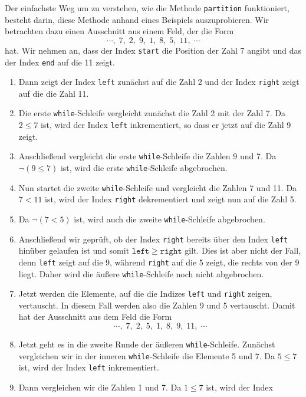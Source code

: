 Der einfachste Weg um zu verstehen, wie die Methode \texttt{partition} funktioniert,
besteht darin, diese Methode anhand eines Beispiels auszuprobieren.  Wir betrachten dazu 
einen Ausschnitt aus einem Feld, der die Form 
\[ \cdots,\; 7,\; 2,\; 9,\; 1,\; 8,\; 5,\; 11,\;\cdots \]
hat.  Wir nehmen an, dass der Index \texttt{start} die Position der Zahl 7 angibt und das
der Index \texttt{end} auf die 11 zeigt.  
\begin{enumerate}
\item Dann zeigt der Index \texttt{left} zun\"achst auf
      die Zahl 2 und der Index \texttt{right} zeigt auf die die Zahl 11.
\item Die erste \texttt{while}-Schleife vergleicht zun\"achst die Zahl 2 mit der Zahl 7.
      Da $2 \leq 7$ ist, wird der Index \texttt{left} inkrementiert, so dass er jetzt auf 
      die Zahl 9 zeigt.
\item Anschlie\ss{}end vergleicht die  erste \texttt{while}-Schleife die Zahlen 9 und 7.
      Da $\neg(9 \leq 7)$ ist, wird die erste \texttt{while}-Schleife abgebrochen.
\item Nun startet die zweite \texttt{while}-Schleife und vergleicht die Zahlen 7 und 11.
      Da $7 < 11$ ist, wird der Index \texttt{right} dekrementiert und zeigt nun auf die
      Zahl 5.
\item Da $\neg (7 < 5)$ ist, wird auch die zweite \texttt{while}-Schleife abgebrochen.
\item Anschlie\ss{}end wir gepr\"uft, ob der Index \texttt{right} bereits \"uber den Index
      \texttt{left} hin\"uber gelaufen ist und somit $\mathtt{left} \geq \mathtt{right}$
      gilt.   Dies ist aber nicht der Fall, denn \texttt{left} zeigt auf die 9,
      w\"ahrend \texttt{right} auf die 5 zeigt, die rechts von der 9 liegt.
      Daher wird die \"au\ss{}ere \texttt{while}-Schleife noch nicht abgebrochen.
\item Jetzt werden die Elemente, auf die die Indizes \texttt{left} und \texttt{right}
      zeigen, vertauscht.  In diesem Fall werden also die Zahlen 9 und 5 vertauscht.
      Damit hat der Ausschnitt aus dem Feld die Form
      \[ \cdots,\; 7,\; 2,\; 5,\; 1,\; 8,\; 9,\; 11,\;\cdots \]
\item Jetzt geht es in die zweite Runde der \"au\ss{}eren \texttt{while}-Schleife.
      Zun\"achst vergleichen wir in der inneren \texttt{while}-Schleife die Elemente
      5 und 7.  Da $5 \leq 7$ ist, wird der Index \texttt{left} inkrementiert.
\item Dann vergleichen wir die Zahlen 1 und 7.  Da $1 \leq 7$ ist, wird der Index

\end{enumerate}
